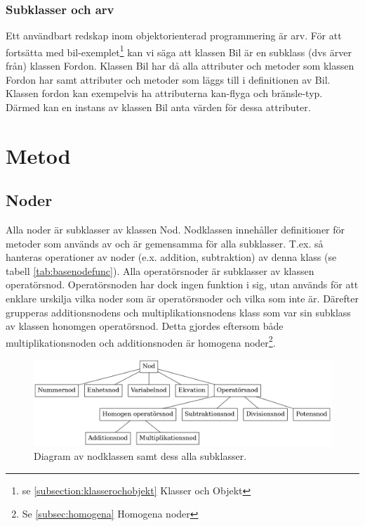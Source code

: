 \documentclass[12pt,a4paper]{article}
\begin{document}
\subsubsection{Subklasser och arv}
Ett användbart redskap inom objektorienterad programmering är arv. För att fortsätta med bil-exemplet\footnote{se \ref{subsection:klasserochobjekt} Klasser och Objekt} kan vi säga att klassen Bil är en subklass (dvs ärver från) klassen Fordon. Klassen Bil har då alla attributer och metoder som klassen Fordon har samt attributer och metoder som läggs till i definitionen av Bil. Klassen fordon kan exempelvis ha attributerna kan-flyga och bränsle-typ. Därmed kan en instans av klassen Bil anta värden för dessa attributer.
\section{Metod}                                                                                      
\subsection{Noder}
Alla noder är subklasser av klassen Nod. Nodklassen innehåller definitioner för metoder som används av och är gemensamma för alla subklasser. T.ex. så hanteras operationer av noder (e.x. addition, subtraktion) av denna klass (se tabell \ref{tab:basenodefunc}). Alla operatörsnoder är subklasser av klassen operatörsnod. Operatörsnoden har dock ingen funktion i sig, utan används för att enklare urskilja vilka noder som är operatörsnoder och vilka som inte är. Därefter grupperas additionsnodens och multiplikationsnodens klass som var sin subklass av klassen honomgen operatörsnod. Detta gjordes eftersom både multiplikationsnoden och additionsnoden är homogena noder\footnote{Se \ref{subsec:homogena} Homogena noder}.
\begin{figure}[h!]
  \center
  \includegraphics[width=1\textwidth]{image20}
  \caption{Diagram av nodklassen samt dess alla subklasser.}
\end{figure}
\end{document}

